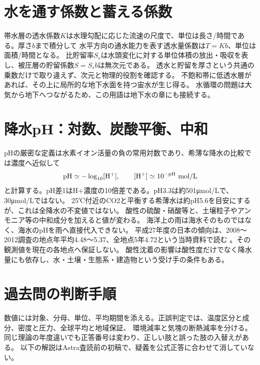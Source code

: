 \section{水を通す係数と蓄える係数}
\label{theory:atmosphere:aquifer}
帯水層の透水係数\(K\)は水理勾配に応じた流速の尺度で、単位は長さ/時間である。厚さ\(b\)まで積分して
水平方向の通水能力を表す透水量係数は\(T=Kb\)、単位は面積/時間となる\cite{atm_usgs_transmissivity}。
比貯留率\(S_s\)は水頭変化に対する単位体積の放出・吸収を表し、被圧層の貯留係数\(S=S_sb\)は無次元である。
透水と貯留を厚さという共通の乗数だけで取り違えず、次元と物理的役割を確認する。
不飽和帯に低透水層があれば、その上に局所的な地下水面を持つ宙水が生じ得る\cite{atm_usgs_perched}。
水循環の問題は大気から地下へつながるため、この用語は地下水の章にも接続する。

\section{降水pH：対数、炭酸平衡、中和}
\label{theory:atmosphere:acid}
pHの厳密な定義は水素イオン活量の負の常用対数であり、希薄な降水の比較では濃度へ近似して
\[
 {\rm pH}\simeq-\log_{10}[{\rm H}^+],\qquad
 [{\rm H}^+]\simeq10^{-{\rm pH}}\ {\rm mol/L}
\]
と計算する。pH差1はH+濃度の10倍差である。pH3.3は約501μmol/Lで、30μmol/Lではない。
25℃付近のCO2と平衡する希薄水は約pH5.6を目安にするが、これは全降水の不変値ではない。
酸性の硫酸・硝酸等と、土壌粒子やアンモニア等の中和成分を加えると値が変わる\cite{atm_jma_acid}。
海洋上の雨は海水そのものではなく、海水のpHを雨へ直接代入できない。
平成27年度の日本の傾向は、2008〜2012調査の地点年平均4.48〜5.37、全地点5年4.72という当時資料で読む
\cite{atm_jma_acid2014}。その観測値を現在の各地点へ保証しない。
酸性沈着の影響は酸性度だけでなく降水量にも依存し、水・土壌・生態系・建造物という受け手の条件もある。

\section{過去問の判断手順}
数値には対象、分母、単位、平均期間を添える。正誤判定では、温度区分と成分、密度と圧力、全球平均と地域保証、
環境減率と気塊の断熱減率を分ける。同じ理論の年度違いでも正答番号は変わり、正しい肢と誤った肢の入替えがある。
以下の解説はAstra査読前の初稿で、疑義を公式正答に合わせて消していない。

